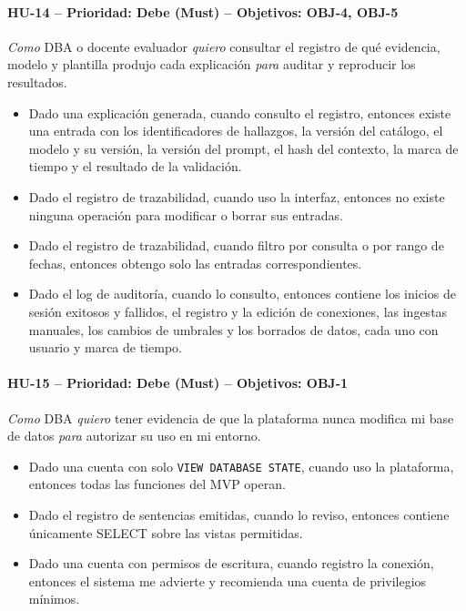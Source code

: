 \documentclass[11pt,a4paper]{report}
\begin{document}
\paragraph{HU-14 -- Prioridad: Debe (Must) -- Objetivos: OBJ-4, OBJ-5}
\textit{Como} DBA o docente evaluador \textit{quiero} consultar el registro de qué evidencia, modelo y plantilla produjo cada explicación \textit{para} auditar y reproducir los resultados.
\begin{itemize}[leftmargin=1.3em,itemsep=1pt]
\item[\textbf{CA-HU14.1}] Dado una explicación generada, cuando consulto el registro, entonces existe una entrada con los identificadores de hallazgos, la versión del catálogo, el modelo y su versión, la versión del prompt, el hash del contexto, la marca de tiempo y el resultado de la validación.
\item[\textbf{CA-HU14.2}] Dado el registro de trazabilidad, cuando uso la interfaz, entonces no existe ninguna operación para modificar o borrar sus entradas.
\item[\textbf{CA-HU14.3}] Dado el registro de trazabilidad, cuando filtro por consulta o por rango de fechas, entonces obtengo solo las entradas correspondientes.
\item[\textbf{CA-HU14.4}] Dado el log de auditoría, cuando lo consulto, entonces contiene los inicios de sesión exitosos y fallidos, el registro y la edición de conexiones, las ingestas manuales, los cambios de umbrales y los borrados de datos, cada uno con usuario y marca de tiempo.
\end{itemize}

\paragraph{HU-15 -- Prioridad: Debe (Must) -- Objetivos: OBJ-1}
\textit{Como} DBA \textit{quiero} tener evidencia de que la plataforma nunca modifica mi base de datos \textit{para} autorizar su uso en mi entorno.
\begin{itemize}[leftmargin=1.3em,itemsep=1pt]
\item[\textbf{CA-HU15.1}] Dado una cuenta con solo \texttt{VIEW DATABASE STATE}, cuando uso la plataforma, entonces todas las funciones del MVP operan.
\item[\textbf{CA-HU15.2}] Dado el registro de sentencias emitidas, cuando lo reviso, entonces contiene únicamente SELECT sobre las vistas permitidas.
\item[\textbf{CA-HU15.3}] Dado una cuenta con permisos de escritura, cuando registro la conexión, entonces el sistema me advierte y recomienda una cuenta de privilegios mínimos.
\end{itemize}
\end{document}
